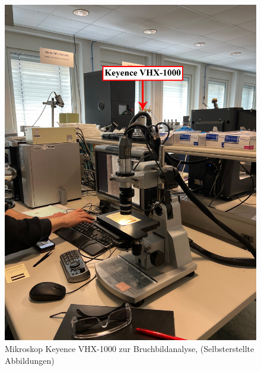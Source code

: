 \begin{figure}[H]
    \centering
    \includegraphics[scale=0.2]{Bilder/WhatsApp Image 2025-03-28 at 20.46.08.jpeg}
    \caption{Mikroskop Keyence VHX-1000 zur Bruchbildanalyse, (Selbsterstellte Abbildungen)}
    \label{VHX}
\end{figure}